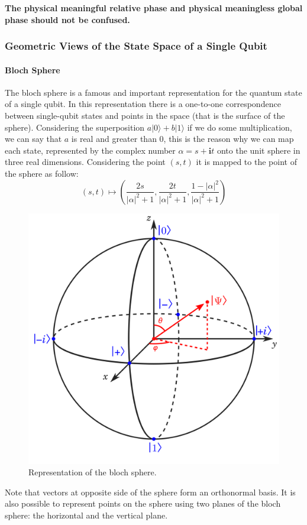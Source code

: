 \documentclass[12pt,a4paper]{report}
\begin{document}
\textbf{The physical meaningful relative phase and physical meaningless global phase should not be confused.}

\subsubsection{Geometric Views of the State Space of a Single Qubit}

\paragraph{Bloch Sphere}
The bloch sphere is a famous and important representation for the quantum state of a single qubit. In this representation there is a one-to-one correspondence between single-qubit states and points in the space (that is the surface of the sphere). Considering the superposition
$ a \vert 0 \rangle + b \vert 1 \rangle $
if we do some multiplication, we can say that $a$ is real and greater than $0$, this is the reason why we can map each state, represented by the complex number
$ \alpha = s + \textbf{i} t $
onto the unit sphere in three real dimensions. Considering the point $ (s, t) $ it is mapped to the point of the sphere as follow:
$$
(s, t)
\mapsto
\left(
\dfrac{ 2s }{ { \vert \alpha \vert }^{2} + 1 },
\dfrac{ 2t }{ { \vert \alpha \vert }^{2} + 1 },
\dfrac{ 1 - { \vert \alpha \vert }^{2} }{ { \vert \alpha \vert }^{2} + 1 }
\right)
$$

\begin{figure}[h]
	\centering
	\includegraphics[width=0.6\linewidth]{img/bloch sphere}
	\caption{Representation of the bloch sphere.}
	\label{Bloch sphere}
\end{figure}

Note that vectors at opposite side of the sphere form an orthonormal basis. It is also possible to represent points on the sphere using two planes of the bloch sphere: the horizontal and the vertical plane.
\end{document}
